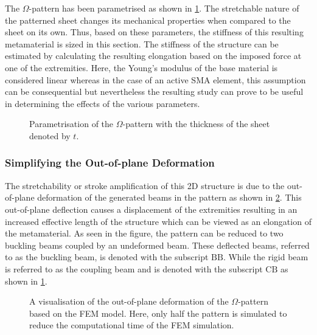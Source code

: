 The $\Omega$-pattern has been parametrised as shown in \cref{fig:kirigami-param}. The stretchable nature of the patterned sheet changes its mechanical properties when compared to the sheet on its own. Thus, based on these parameters, the stiffness of this resulting metamaterial is sized in this section. The stiffness of the structure can be estimated by calculating the resulting elongation based on the imposed force at one of the extremities. Here, the Young's modulus of the base material is considered linear whereas in the case of an active SMA element, this assumption can be consequential but nevertheless the resulting study can prove to be useful in determining the effects of the various parameters.

\begin{figure}[hbt!]
    \centering
    
    \caption{Parametrisation of the $\Omega$-pattern with the thickness of the sheet denoted by $t$.}
    \label{fig:kirigami-param}
\end{figure}

\subsubsection{Simplifying the Out-of-plane Deformation}
The stretchability or stroke amplification of this 2D structure is due to the out-of-plane deformation of the generated beams in the pattern as shown in \cref{fig:ohm-pattern-deformed}. This out-of-plane deflection causes a displacement of the extremities resulting in an increased effective length of the structure which can be viewed as an elongation of the metamaterial. As seen in the figure, the pattern can be reduced to two buckling beams coupled by an undeformed beam. These deflected beams, referred to as the buckling beam, is denoted with the subscript $\mathrm{BB}$. While the rigid beam is referred to as the coupling beam and is denoted with the subscript $\mathrm{CB}$ as shown in \cref{fig:kirigami-param}.

\begin{figure}[hbt]
    \centering
    
    \caption{A visualisation of the out-of-plane deformation of the $\Omega$-pattern based on the FEM model. Here, only half the pattern is simulated to reduce the computational time of the FEM simulation.}
    \label{fig:ohm-pattern-deformed}
\end{figure}


